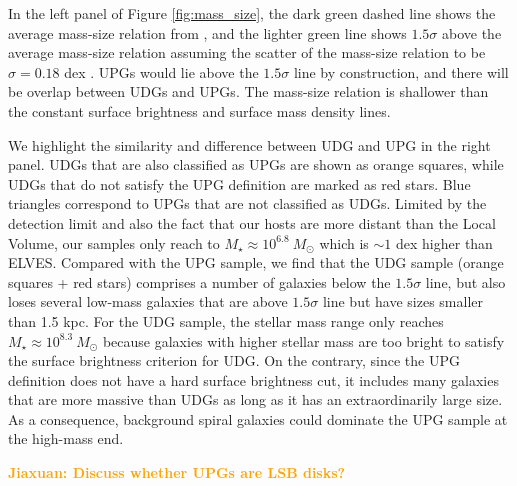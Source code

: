 \documentclass[twocolumn,astrosymb,twocolappendix]{aastex631}
\newcommand{\jiaxuan}[1]{\textcolor{orange}{\textbf{Jiaxuan: #1}}}
\begin{document}
\begin{CJK*}{UTF8}{gbsn}
In the left panel of Figure \ref{fig:mass_size}, the dark green dashed line shows the average mass-size relation from \citep{ELVES-I}, and the lighter green line shows $1.5\sigma$ above the average mass-size relation assuming the scatter of the mass-size relation to be $\sigma=0.18$ dex \citep{ELVES-I}. UPGs would lie above the $1.5\sigma$ line by construction, and there will be overlap between UDGs and UPGs. The mass-size relation is shallower than the constant surface brightness and surface mass density lines.

We highlight the similarity and difference between UDG and UPG in the right panel. UDGs that are also classified as UPGs are shown as orange squares, while UDGs that do not satisfy the UPG definition are marked as red stars. Blue triangles correspond to UPGs that are not classified as UDGs. Limited by the detection limit and also the fact that our hosts are more distant than the Local Volume, our samples only reach to $M_\star \approx 10^{6.8}\ M_\odot$ which is $\sim 1$ dex higher than ELVES. 
Compared with the UPG sample, we find that the UDG sample (orange squares + red stars) comprises a number of galaxies below the $1.5\sigma$ line, but also loses several low-mass galaxies that are above $1.5\sigma$ line but have sizes smaller than 1.5 kpc. For the UDG sample, the stellar mass range only reaches $M_\star\approx 10^{8.3}\ M_\odot$ because galaxies with higher stellar mass are too bright to satisfy the surface brightness criterion for UDG. On the contrary, since the UPG definition does not have a hard surface brightness cut, it includes many galaxies that are more massive than UDGs as long as it has an extraordinarily large size. As a consequence, background spiral galaxies could dominate the UPG sample at the high-mass end. 

\jiaxuan{Discuss whether UPGs are LSB disks?}





\end{CJK*}
\end{document}
